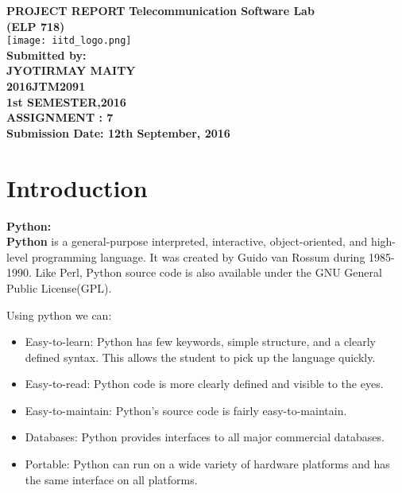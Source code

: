 \documentclass{article}
\begin{document}
\begin{titlepage}
\begin{center}

\Huge{\textbf{PROJECT REPORT}}
\bigskip
\huge{\textbf{ Telecommunication Software Lab}}\\
\textsc{\textbf{ (ELP 718)}}\\
[2cm]



\texttt{[image: iitd\_logo.png]}\\
[2cm]
\textbf{Submitted by:}\\


\textbf{ JYOTIRMAY MAITY}\\

\LARGE\textbf{ 2016JTM2091}\\
\Large{\textbf{ 1st SEMESTER,2016}}\\
\bigskip
\bigskip
\textbf{ASSIGNMENT : 7} \\
\bigskip
\textbf{Submission Date: 12th September, 2016}

\end{center}
\end{titlepage}

\tableofcontents
\thispagestyle{empty}
\cleardoublepage
\listoffigures
\thispagestyle{empty}
\cleardoublepage
\setcounter{page}{1}

\section{Introduction}

\Large{\textbf{ Python:}}\\
\textbf{Python} is a general-purpose interpreted, interactive, object-oriented, and high-level
programming language. It was created by Guido van Rossum during 1985- 1990.
Like Perl, Python source code is also available under the GNU General Public License(GPL).
\vspace{10mm}


Using python we can:
\begin{itemize}
\item Easy-to-learn: Python has few keywords, simple structure, and a clearly defined syntax. This allows the student to pick up the language quickly.
\item Easy-to-read: Python code is more clearly defined and visible to the eyes.
\item Easy-to-maintain: Python's source code is fairly easy-to-maintain.
\item Databases: Python provides interfaces to all major commercial databases.
\item Portable: Python can run on a wide variety of hardware platforms and has the
same interface on all platforms.
\end{itemize}
\cleardoublepage
\end{document}
